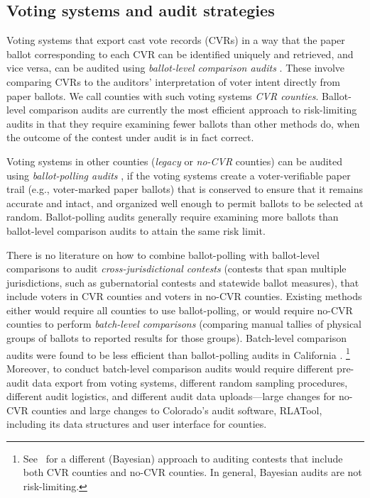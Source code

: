 \documentclass[runningheads]{llncs}
\begin{document}
\subsection{Voting systems and audit strategies}

Voting systems that export cast vote records (CVRs) in a way that the paper ballot corresponding to each CVR can be identified uniquely and retrieved, and vice versa, 
can be audited using \emph{ballot-level comparison audits} \cite{lindemanStark12}.
These involve comparing CVRs to the auditors' interpretation of voter intent directly from paper ballots.
We call counties with such voting systems \emph{CVR counties}.
Ballot-level comparison audits are currently the most efficient approach to risk-limiting audits in that they require examining fewer ballots than other methods do, when the outcome of the contest under audit is in fact correct.

Voting systems in other counties (\emph{legacy} or \emph{no-CVR} counties) can be audited using \emph{ballot-polling audits} \cite{lindemanEtal12,lindemanStark12}, if the voting systems create a voter-verifiable paper trail (e.g., voter-marked paper ballots) that is conserved to ensure that it remains accurate and intact, and organized well enough to permit ballots to be selected at random.
Ballot-polling audits generally require examining more ballots than ballot-level comparison audits to attain the same risk limit.

There is no literature on how to combine ballot-polling with ballot-level comparisons to audit \textit{cross-jurisdictional contests}
(contests that span multiple jurisdictions, such as gubernatorial contests and statewide ballot measures), 
that include voters in CVR counties and voters in no-CVR counties.
Existing methods either would require all counties to use ballot-polling, or would require no-CVR counties to perform \textit{batch-level comparisons} (comparing manual tallies of physical groups of ballots to reported results for those groups).
Batch-level comparison audits were found to be less efficient than ballot-polling audits in California \cite{CA_SOS_EAC}.%
\footnote{%
  See~\cite{Rivest-2018-bayesian-tabulation-audits}
  for a different (Bayesian) approach to auditing contests that include both CVR counties
  and no-CVR counties. In general, Bayesian audits are not risk-limiting.
}
Moreover, to conduct batch-level comparison audits would require different pre-audit data export from voting systems, different random sampling procedures, different audit logistics, and different audit data uploads---large changes for no-CVR counties and large changes to Colorado's audit software, RLATool, including its data structures and user interface for counties.
\end{document}

